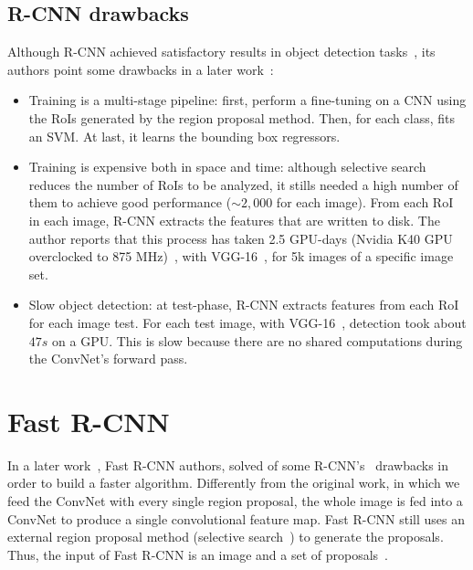 \subsection{R-CNN drawbacks}
%
Although R-CNN achieved satisfactory results in object detection tasks~\cite{Girshick2016RCNN},
its authors point some drawbacks in a later work~\cite{Girshick2015}:
%
\begin{itemize}
 \item Training is a multi-stage pipeline:
 first, perform a fine-tuning on a CNN using the RoIs generated by the region proposal method.
 Then, for each class, fits an SVM.
 At last, it learns the bounding box regressors.
 \item Training is expensive both in space and time:
 although selective search reduces the number of RoIs to be analyzed, it stills needed a high number of them to achieve good performance ($\sim2,000$ for each image).
 From each RoI in each image, R-CNN extracts the features that are written to disk.
 The author reports that this process has taken 2.5 GPU-days (Nvidia K40 GPU overclocked to 875 MHz)~\cite{Girshick2015}, with VGG-16~\cite{Simonyan2015VGG}, for 5k images of a specific image set.
 \item Slow object detection: at test-phase, R-CNN extracts features from each RoI for each image test.
 For each test image, with VGG-16~\cite{Simonyan2015VGG}, detection took about $47s$  on a GPU.
 This is slow because there are no shared computations during the ConvNet's forward pass.
\end{itemize}


\section{Fast R-CNN}\label{sec:fast_r-cnn}
%
In a later work~\cite{Girshick2015}, Fast R-CNN authors, solved of some R-CNN's~\cite{Girshick2016RCNN} drawbacks in order to build a faster algorithm.
Differently from the original work, in which we feed the ConvNet with every single region proposal,
the whole image is fed into a ConvNet to produce a single convolutional feature map.
Fast R-CNN still uses an external region proposal method (\eg selective search~\cite{Uijlings2013ss}) to generate the proposals.
Thus, the input of Fast R-CNN is an image and a set of proposals~\cite{Girshick2015}.

